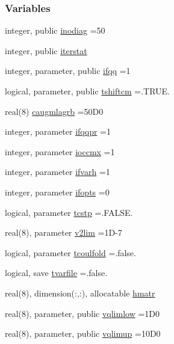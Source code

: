 \subsubsection*{Variables}
\begin{DoxyCompactItemize}
\item 
integer, public \hyperlink{namespacestaticstep_a7c45df3e5b6980084116405e280a9f1e}{inodiag} =50
\item 
integer, public \hyperlink{namespacestaticstep_a86d905176be26dd2e3298e4a93df1195}{iterstat}
\item 
integer, parameter, public \hyperlink{namespacestaticstep_a5b2a4a8f2936782b9d82c2ef307483a9}{ifqq} =1
\item 
logical, parameter, public \hyperlink{namespacestaticstep_adc9c0c23d06e25e92e85a216712c6154}{tshiftcm} =.T\+R\+U\+E.
\item 
real(8) \hyperlink{namespacestaticstep_af67d6280afe5bb85094f540b7745b3ff}{caugmlagrb} =50\+D0
\item 
integer, parameter \hyperlink{namespacestaticstep_a47f36e15f8422ee671acd2861b0aefb3}{ifqqpr} =1
\item 
integer, parameter \hyperlink{namespacestaticstep_a397d9c54d15061e7cfec64610233bdac}{ioccmx} =1
\item 
integer, parameter \hyperlink{namespacestaticstep_afb495985f10f48f0820ffc0a35884c29}{ifvarh} =1
\item 
integer, parameter \hyperlink{namespacestaticstep_a6234332d57c0353da44fba6dd923ebf2}{ifopts} =0
\item 
logical, parameter \hyperlink{namespacestaticstep_a7fb35294b1ede0791d641687cc28fda6}{tcstp} =.F\+A\+L\+S\+E.
\item 
real(8), parameter \hyperlink{namespacestaticstep_a1b09ef2334c64437644701c17a440ca5}{v2lim} =1\+D-\/7
\item 
logical, parameter \hyperlink{namespacestaticstep_adffa15eea060b1ffa80c6aaf1aac37ee}{tcoulfold} =.false.
\item 
logical, save \hyperlink{namespacestaticstep_ac12060bc672bbf63f1d4c9aaee259595}{tvarfile} =.false.
\item 
real(8), dimension(\+:,\+:), allocatable \hyperlink{namespacestaticstep_a929a7dc3c5e6260892e06030be3db7af}{hmatr}
\item 
real(8), parameter, public \hyperlink{namespacestaticstep_ae5b772f9920183fe3d5d039a8d9d8572}{vqlimlow} =1\+D0
\item 
real(8), parameter, public \hyperlink{namespacestaticstep_a2e05c48e66e07d84c7085d757222c663}{vqlimup} =10\+D0

\end{DoxyCompactItemize}
